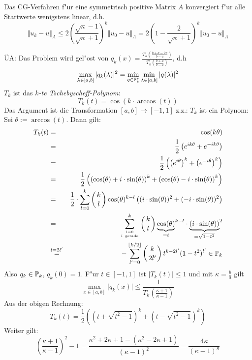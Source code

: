 \documentclass{scrartcl}
\begin{document}
\begin{Satz}
Das CG-Verfahren f"ur eine symmetrisch positive Matrix $A$ konvergiert f"ur alle Startwerte wenigstens linear, d.h.
$$\Vert u_k - u \Vert_A \leq 2 \left( \frac{ \sqrt{\kappa} - 1 }{\sqrt{ \kappa} + 1} \right)^k \Vert u_0 - u \Vert_A = 2 \left( 1 - \frac{2}{\sqrt{\kappa} + 1} \right)^k \Vert u_0 - u \Vert_A$$
\end{Satz}
\begin{Bew}
ÜA: Das Problem wird gel"ost von $q_k(x) = \frac{ T_k \left( \frac{b+a-2 x}{b-a} \right) }{ T_k \left( \frac{ b+a }{b-a} \right)}$, d.h
$$ \max_{\lambda \in [a,b]} \vert q_k(\lambda) \vert^2 = \min_{q \in \mathbb{P}_k^*} \min_{\lambda \in [a,b]} \vert q(\lambda) \vert^2$$ 
$T_k$ ist das \emph{$k$-te Tschebyscheff-Polynom}:
$$T_k(t) = \cos(k \cdot \arccos(t))$$
Das Argument ist die Transformation $[a,b] \rightarrow [-1,1]$
z.z.: $T_k$ ist ein Polynom: \\
Sei $\theta := \arccos(t)$. Dann gilt:
\begin{eqnarray*}
T_k(t) & = & \cos(k \theta) \\
& = & \frac12 \left( e^{ik \theta} + e^{-i k \theta} \right) \\
& = & \frac12 \left( \left( e^{i \theta} \right)^k + \left( e^{-i \theta} \right)^k \right) \\
& = & \frac12 \left( \left( \cos(\theta) + i \cdot \sin(\theta) \right)^k + \left( \cos (\theta) - i \cdot \sin(\theta) \right)^k \right) \\
& = & \frac{1}{2} \cdot \sum\limits_{l=0}^k \left( \genfrac{}{}{0pt}{}{k}{l} \right) \cos(\theta)^{k-l} \left( (i \cdot \sin(\theta) )^2 + (-i \cdot \sin(\theta))^2 \right) \\
& = & \sum\limits_{\genfrac{}{}{0pt}{}{l=0}{l \mathrm{\ gerade}}}^k \left( \genfrac{}{}{0pt}{}{k}{l} \right) {\underbrace{\cos(\theta)}_{=t}}^{k-l} \cdot {\underbrace{ (i \cdot \sin(\theta) )}_{= \sqrt{1 - t^2}}}^2 \\
& \stackrel{l=2l'}{=} & - \sum\limits_{l'=0}^{\lfloor k/2 \rfloor} \left( \genfrac{}{}{0pt}{}{k}{2l'} \right) t^{k-2l'} (1-t^2)^{l'} \in \PP_k
\end{eqnarray*}
Also $q_k \in \mathbb{P}_k$, $q_k(0) = 1$. F"ur $t \in [-1,1]$ ist $\vert T_k(t) \vert \leq 1$ und mit $\kappa = \frac{b}{a}$ gilt 
$$\max\limits_{x \in [a,b]} \vert q_k(x) \vert \leq \frac{1}{T_k\left( \frac{\kappa + 1}{\kappa - 1} \right)}$$
Aus der obigen Rechnung:
$$T_k(t) = \frac12 \left( (t + \sqrt{t^2 - 1})^k + (t - \sqrt{t^2 - 1} )^k \right)$$ 
Weiter gilt:
$$ \left( \frac{\kappa + 1}{\kappa - 1} \right)^2 - 1 = \frac{ \kappa^2 + 2 \kappa + 1 - (\kappa^2 - 2 \kappa + 1)}{(\kappa - 1)^2} = \frac{4 \kappa}{(\kappa - 1)^\kappa}$$

\end{Bew}
\end{document}
